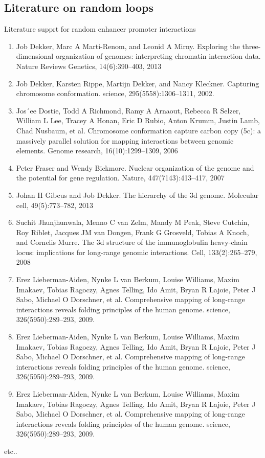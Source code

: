 \documentclass[8pt]{beamer}
\begin{document}
\subsection{Literature on random loops}
\begin{frame}{Literature supprt for random enhancer promoter interactions}
\scriptsize{
\begin{enumerate}
\item Job Dekker, Marc A Marti-Renom, and Leonid A Mirny. Exploring
the three-dimensional organization of genomes: interpreting chromatin
interaction data. Nature Reviews Genetics, 14(6):390–403, 2013
\item Job Dekker, Karsten Rippe, Martijn Dekker, and Nancy Kleckner. Capturing chromosome conformation. science, 295(5558):1306–1311, 2002.
\item Jos´ee Dostie, Todd A Richmond, Ramy A Arnaout, Rebecca R Selzer,
William L Lee, Tracey A Honan, Eric D Rubio, Anton Krumm, Justin
Lamb, Chad Nusbaum, et al. Chromosome conformation capture carbon
copy (5c): a massively parallel solution for mapping interactions between
genomic elements. Genome research, 16(10):1299–1309, 2006
\item Peter Fraser and Wendy Bickmore. Nuclear organization of the genome
and the potential for gene regulation. Nature, 447(7143):413–417, 2007
\item Johan H Gibcus and Job Dekker. The hierarchy of the 3d genome.
Molecular cell, 49(5):773–782, 2013
\item Suchit Jhunjhunwala, Menno C van Zelm, Mandy M Peak, Steve
Cutchin, Roy Riblet, Jacques JM van Dongen, Frank G Grosveld, Tobias A Knoch, and Cornelis Murre. The 3d structure of the immunoglobulin heavy-chain locus: implications for long-range genomic interactions.
Cell, 133(2):265–279, 2008
\item Erez Lieberman-Aiden, Nynke L van Berkum, Louise Williams, Maxim
Imakaev, Tobias Ragoczy, Agnes Telling, Ido Amit, Bryan R Lajoie,
Peter J Sabo, Michael O Dorschner, et al. Comprehensive mapping of
long-range interactions reveals folding principles of the human genome.
science, 326(5950):289–293, 2009.
\item Erez Lieberman-Aiden, Nynke L van Berkum, Louise Williams, Maxim
Imakaev, Tobias Ragoczy, Agnes Telling, Ido Amit, Bryan R Lajoie,
Peter J Sabo, Michael O Dorschner, et al. Comprehensive mapping of
long-range interactions reveals folding principles of the human genome.
science, 326(5950):289–293, 2009.
\item Erez Lieberman-Aiden, Nynke L van Berkum, Louise Williams, Maxim
Imakaev, Tobias Ragoczy, Agnes Telling, Ido Amit, Bryan R Lajoie,
Peter J Sabo, Michael O Dorschner, et al. Comprehensive mapping of
long-range interactions reveals folding principles of the human genome.
science, 326(5950):289–293, 2009.
\end{enumerate}
}
etc..
\end{frame}
\end{document}
